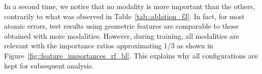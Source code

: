         In a second time, we notice that no modality is more important than the others, contrarily to what was observed in Table~\ref{tab::ablation_f3}.
        In fact, for most atomic errors, test results using geometric features are comparable to those obtained with more modalities.
        However, during training, all modalities are relevant with the importance ratios approximating 1/3 as shown in Figure~\ref{fig::feature_importances_rf_bl}.
        This explains why all configurations are kept for subsequent analysis.
